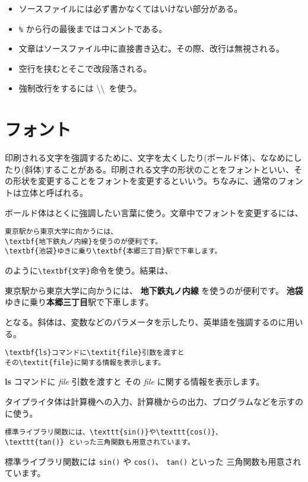 \begin{itemize}
    \item ソースファイルには必ず書かなくてはいけない部分がある。
    \item \texttt{\%} から行の最後まではコメントである。
    \item 文章はソースファイル中に直接書き込む。その際、改行は無視される。
    \item 空行を挟むとそこで改段落される。
    \item 強制改行をするには \textbackslash\textbackslash\, を使う。
\end{itemize}



\section{フォント}
\label{sec:latex:font}

印刷される文字を強調するために、文字を太くしたり(ボールド体)、ななめにしたり(斜体)することがある。印刷される文字の形状のことをフォントといい、その形状を変更することをフォントを変更するといいう。ちなみに、通常のフォントは立体と呼ばれる。

ボールド体はとくに強調したい言葉に使う。文章中でフォントを変更するには、
\begin{reidai}
    \begin{verbatim}
東京駅から東京大学に向かうには、
\textbf{地下鉄丸ノ内線}を使うのが便利です。
\textbf{池袋}ゆきに乗り\textbf{本郷三丁目}駅で下車します。
\end{verbatim}
\end{reidai} \noindent
のように\verb|\textbf{文字}|命令を使う。結果は、
\begin{kekka}
    東京駅から東京大学に向かうには、
    \textbf{地下鉄丸ノ内線} を使うのが便利です。
    \textbf{池袋}ゆきに乗り\textbf{本郷三丁目}駅で下車します。
\end{kekka} \noindent
となる。斜体は、変数などのパラメータを示したり、英単語を強調するのに用いる。
\begin{reidai}
    \begin{verbatim}
\textbf{ls}コマンドに\textit{file}引数を渡すと
その\textit{file}に関する情報を表示します。
\end{verbatim}
\end{reidai}
\vspace*{-1.5em}
\begin{kekka}
    \textbf{ls} コマンドに \textit{file} 引数を渡すと
    その \textit{file} に関する情報を表示します。
\end{kekka} \noindent
タイプライタ体は計算機への入力、計算機からの出力、プログラムなどを示すのに使う。
\begin{reidai}
    \begin{verbatim}
標準ライブラリ関数には、\texttt{sin()}や\texttt{cos()}、
\texttt{tan()} といった三角関数も用意されています。
\end{verbatim}
\end{reidai}
\vspace*{-1.5em}
\begin{kekka}
    標準ライブラリ関数には \texttt{sin()} や \texttt{cos()}、
    \texttt{tan()} といった
    三角関数も用意されています。
\end{kekka}

